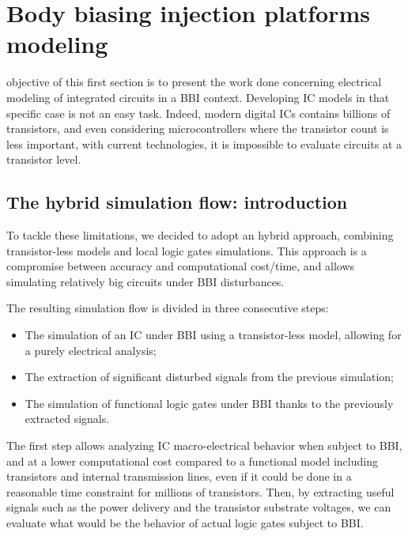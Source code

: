 
\section{Body biasing injection platforms modeling}
 objective of this first section is to present the work done concerning electrical modeling of integrated circuits in a BBI context.
Developing IC models in that specific case is not an easy task.
Indeed, modern digital ICs contains billions of transistors, and even considering microcontrollers where the transistor count is less important, with current technologies, it is impossible to evaluate circuits at a transistor level.

\subsection{The hybrid simulation flow: introduction}
To tackle these limitations, we decided to adopt an hybrid approach, combining transistor-less models and local logic gates simulations.
This approach is a compromise between accuracy and computational cost/time, and allows simulating relatively big circuits under BBI disturbances.

The resulting simulation flow is divided in three consecutive steps:
\begin{itemize}
	\item The simulation of an IC under BBI using a transistor-less model, allowing for a purely electrical analysis;
	\item The extraction of significant disturbed signals from the previous simulation;
	\item The simulation of functional logic gates under BBI thanks to the previously extracted signals.
\end{itemize}
The first step allows analyzing IC macro-electrical behavior when subject to BBI, and at a lower computational cost compared to a functional model including transistors and internal transmission lines, even if it could be done in a reasonable time constraint for millions of transistors.
Then, by extracting useful signals such as the power delivery and the transistor substrate voltages, we can evaluate what would be the behavior of actual logic gates subject to BBI.

